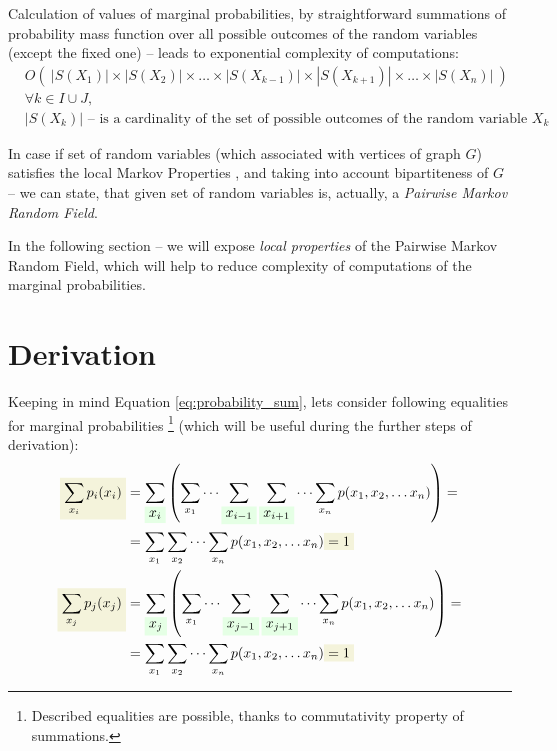 \documentclass[fleqn,leqno]{article}
\newcommand{\highlight}[1]{\colorbox{green!10}{$\displaystyle#1$}}
\newcommand{\highlightred}[1]{\colorbox{olive!10}{$\displaystyle#1$}}
\begin{document}
Calculation of values of marginal probabilities, by straightforward summations of probability mass function over all possible outcomes of the random variables (except the fixed one) -- leads to exponential complexity of computations:
\begin{equation}
\begin{split}
   & O\left(\ |S(X_1)| \times |S(X_2)| \times \dots \times |S(X_{k-1})| \times |S(X_{k+1})| \times \dots \times |S(X_n)| \ \right) \\
   & \forall k \in I \cup J,\\
   & \text{$|S(X_k)|$ -- is a cardinality of the set of possible outcomes of the random variable $X_k$}
\end{split}
\end{equation}

In case if set of random variables (which associated with vertices of graph $G$) satisfies the local Markov Properties \cite{wikipedia_markov_random_field}, and taking into account bipartiteness of $G$ -- we can state, that given set of random variables is, actually, a \emph{Pairwise Markov Random Field}.

In the following section -- we will expose \emph{local properties} of the Pairwise Markov Random Field, which will help to reduce complexity of computations of the marginal probabilities.

\section{Derivation}

Keeping in mind Equation \eqref{eq:probability_sum}, lets consider following equalities for marginal probabilities \footnote{Described equalities are possible, thanks to commutativity property of summations.} (which will be useful during the further steps of derivation):
\begin{equation} \label{eq:sum_over_states_of_one_node_marginal_probabilities}
\begin{split}
\highlightred{ \sum_{x_i} p_i(x_i) } & =  \sum_{ \highlight{ x_i } } \left( \sum_{x_1} \cdots \sum_{ \highlight{ x_{i - 1} } } \sum_{ \highlight{ x_{i + 1} } } \cdots \sum_{x_n} p(x_1, x_2, \dots x_n) \right) = \\
                               & = \sum_{x_1} \sum_{x_2} \cdots \sum_{x_n}  p(x_1, x_2, \dots x_n) \highlightred{ = 1 } \\
\highlightred{ \sum_{x_j} p_j(x_j) } & = \sum_{ \highlight{ x_j } } \left( \sum_{x_1} \cdots \sum_{ \highlight{ x_{j - 1} } } \sum_{ \highlight{ x_{j + 1} } } \cdots \sum_{x_n} p(x_1, x_2, \dots x_n) \right) = \\
                               & = \sum_{x_1} \sum_{x_2} \cdots \sum_{x_n}  p(x_1, x_2, \dots x_n) \highlightred{ = 1 }
\end{split}
\end{equation}
\end{document}
